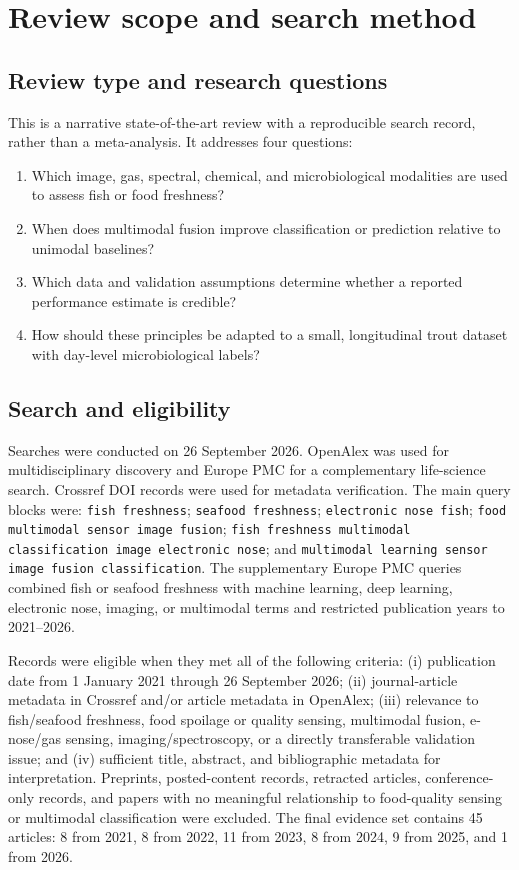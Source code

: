 \documentclass[11pt]{article}
\begin{document}
\section{Review scope and search method}

\subsection{Review type and research questions}

This is a narrative state-of-the-art review with a reproducible search record, rather than a meta-analysis. It addresses four questions:
\begin{enumerate}[leftmargin=*,itemsep=2pt]
  \item Which image, gas, spectral, chemical, and microbiological modalities are used to assess fish or food freshness?
  \item When does multimodal fusion improve classification or prediction relative to unimodal baselines?
  \item Which data and validation assumptions determine whether a reported performance estimate is credible?
  \item How should these principles be adapted to a small, longitudinal trout dataset with day-level microbiological labels?
\end{enumerate}

\subsection{Search and eligibility}

Searches were conducted on 26 September 2026. OpenAlex was used for multidisciplinary discovery and Europe PMC for a complementary life-science search. Crossref DOI records were used for metadata verification. The main query blocks were: \texttt{fish freshness}; \texttt{seafood freshness}; \texttt{electronic nose fish}; \texttt{food multimodal sensor image fusion}; \texttt{fish freshness multimodal classification image electronic nose}; and \texttt{multimodal learning sensor image fusion classification}. The supplementary Europe PMC queries combined fish or seafood freshness with machine learning, deep learning, electronic nose, imaging, or multimodal terms and restricted publication years to 2021--2026.

Records were eligible when they met all of the following criteria: (i) publication date from 1 January 2021 through 26 September 2026; (ii) journal-article metadata in Crossref and/or article metadata in OpenAlex; (iii) relevance to fish/seafood freshness, food spoilage or quality sensing, multimodal fusion, e-nose/gas sensing, imaging/spectroscopy, or a directly transferable validation issue; and (iv) sufficient title, abstract, and bibliographic metadata for interpretation. Preprints, posted-content records, retracted articles, conference-only records, and papers with no meaningful relationship to food-quality sensing or multimodal classification were excluded. The final evidence set contains 45 articles: 8 from 2021, 8 from 2022, 11 from 2023, 8 from 2024, 9 from 2025, and 1 from 2026.
\end{document}
